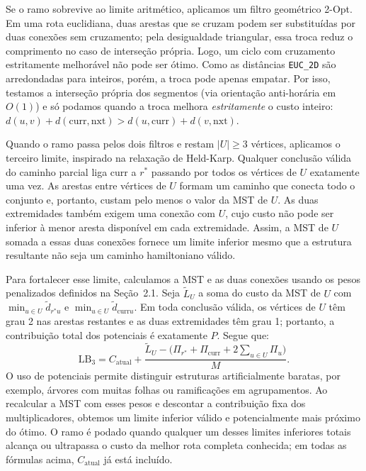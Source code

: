 \documentclass[12pt]{article}
\begin{document}
Se o ramo sobrevive ao limite aritmético, aplicamos um filtro geométrico 2-Opt. Em uma rota euclidiana, duas arestas que se cruzam podem ser substituídas por duas conexões sem cruzamento; pela desigualdade triangular, essa troca reduz o comprimento no caso de interseção própria. Logo, um ciclo com cruzamento estritamente melhorável não pode ser ótimo. Como as distâncias \texttt{EUC\_2D} são arredondadas para inteiros, porém, a troca pode apenas empatar. Por isso, testamos a interseção própria dos segmentos (via orientação anti-horária em $O(1)$) e só podamos quando a troca melhora \emph{estritamente} o custo inteiro: $d(u,v)+d(\mathrm{curr},\mathrm{nxt})>d(u,\mathrm{curr})+d(v,\mathrm{nxt})$.

Quando o ramo passa pelos dois filtros e restam $|U|\geq3$ vértices, aplicamos o terceiro limite, inspirado na relaxação de Held-Karp. Qualquer conclusão válida do caminho parcial liga $\mathrm{curr}$ a $r^*$ passando por todos os vértices de $U$ exatamente uma vez. As arestas entre vértices de $U$ formam um caminho que conecta todo o conjunto e, portanto, custam pelo menos o valor da MST de $U$. As duas extremidades também exigem uma conexão com $U$, cujo custo não pode ser inferior à menor aresta disponível em cada extremidade. Assim, a MST de $U$ somada a essas duas conexões fornece um limite inferior mesmo que a estrutura resultante não seja um caminho hamiltoniano válido.

Para fortalecer esse limite, calculamos a MST e as duas conexões usando os pesos penalizados definidos na Seção~2.1. Seja $\widetilde L_U$ a soma do custo da MST de $U$ com $\min_{u\in U}\tilde d_{r^*u}$ e $\min_{u\in U}\tilde d_{\mathrm{curr}u}$. Em toda conclusão válida, os vértices de $U$ têm grau 2 nas arestas restantes e as duas extremidades têm grau 1; portanto, a contribuição total dos potenciais é exatamente $P$. Segue que:
\begin{equation}
  \mathrm{LB}_{3}=C_{\mathrm{atual}}+\frac{\widetilde L_U-\bigl(\Pi_{r^*}+\Pi_{\mathrm{curr}}+2\sum_{u\in U}\Pi_u\bigr)}{M}.
\end{equation}
O uso de potenciais permite distinguir estruturas artificialmente baratas, por exemplo, árvores com muitas folhas ou ramificações em agrupamentos. Ao recalcular a MST com esses pesos e descontar a contribuição fixa dos multiplicadores, obtemos um limite inferior válido e potencialmente mais próximo do ótimo. O ramo é podado quando qualquer um desses limites inferiores totais alcança ou ultrapassa o custo da melhor rota completa conhecida; em todas as fórmulas acima, $C_{\mathrm{atual}}$ já está incluído.
\end{document}

